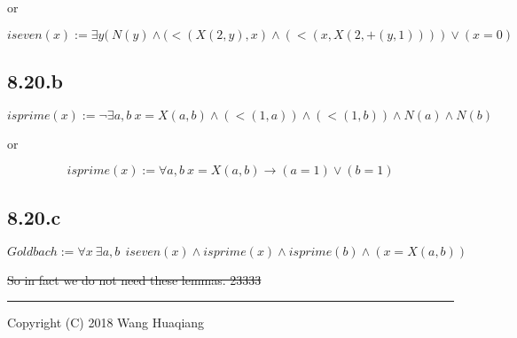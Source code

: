 \documentclass{article} %
\begin{document}
  or
  
  \[ iseven(x) := \exists y (\ N(y)\wedge (<(X(2,y),x)\wedge (<(x,X(2,+(y,1))))\vee (x=0)\]
  
  \hypertarget{b}{%
  \subsection{8.20.b}\label{b}}
  
  \[ isprime(x) := \neg \exists a,b \ x=X(a,b)\wedge(<(1,a))\wedge(<(1,b))\wedge N(a) \wedge N(b)\]
  
  or
  
  \[ isprime(x) := \forall a,b \ x=X(a,b)\rightarrow (a=1)\vee (b=1)\]
  
  \hypertarget{c}{%
  \subsection{8.20.c}\label{c}}
  
  \[Goldbach := \forall x \ \exists a,b \ \ iseven(x) \wedge isprime(x) \wedge isprime(b) \wedge (x=X(a,b))\]
  
  \sout{So in fact we do not need these lemmas. 23333}
  
  \begin{center}\rule{0.5\linewidth}{\linethickness}\end{center}
  
  \begin{center}
  Copyright (C) 2018 Wang Huaqiang 
  \end{center}
\end{document}
